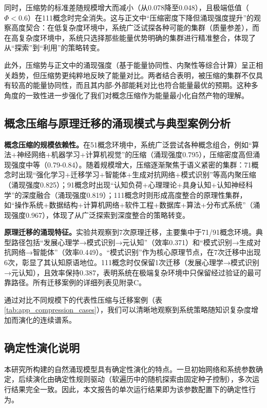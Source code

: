 \documentclass[12pt,a4paper]{article}
\begin{document}
同时，压缩势的标准差随规模增大而减小（从0.078降至0.048），且极端低值（$\Phi<0.6$）在111概念时完全消失。这与正文中“压缩密度下降但涌现强度提升”的观察高度契合：在低复杂度环境中，系统广泛试探各种可能的集群（质量参差），而在高复杂度环境中，系统只选择那些能量优势明确的集群进行精准整合，体现了从“探索”到“利用”的策略转变。

此外，压缩势与正文中的涌现强度（基于能量协同性、内聚性等综合计算）呈正相关趋势，但压缩势更纯粹地反映了能量对比。两者结合表明，被压缩的集群不仅具有较高的能量协同性，而且其内部-外部能耗对比也符合能量最优的预期。这种多角度的一致性进一步强化了我们对概念压缩作为能量最小化自然产物的理解。

\subsection{概念压缩与原理迁移的涌现模式与典型案例分析}

\textbf{概念压缩的规模依赖性。}在51概念环境中，系统广泛尝试各种概念组合，例如“算法+神经网络+机器学习+计算机视觉”的压缩（涌现强度0.795），压缩密度高但涌现强度中等（0.79-0.84）。随着规模增大，压缩逐渐聚焦于语义紧密的集群：71概念时出现“强化学习+迁移学习+智能体+生成对抗网络+模式识别”等高内聚压缩（涌现强度0.825）；91概念时出现“认知负荷+心理理论+具身认知+认知神经科学”的深度融合（涌现强度0.819）；111概念时则形成高度整合的原理性集群，如“操作系统+数据结构+计算机网络+软件工程+数据库+算法+分布式系统”（涌现强度0.967），体现了从广泛探索到深度整合的策略转变。

\textbf{原理迁移的涌现特征。}实验共观察到7次原理迁移，主要集中于71/91概念环境。典型路径包括“发展心理学→模式识别→元认知”（效率0.371）和“模式识别→生成对抗网络→智能体”（效率0.449）。“模式识别”作为核心原理节点，在7次迁移中出现6次，彰显了其认知原语地位。111概念时仅保留1次迁移（发展心理学→模式识别→元认知），且效率保持0.387，表明系统在极端复杂环境中只保留经过验证的最可靠路径。所有迁移案例的详细列表见附录C。

通过对比不同规模下的代表性压缩与迁移案例（表\ref{tab:app_compression_cases}），我们可以清晰地观察到系统策略随知识复杂度增加而演化的连续谱系。

\subsection{确定性演化说明}

本研究所构建的自然涌现模型具有确定性演化的特点。一旦初始网络和系统参数确定，后续演化由确定性规则驱动（软遍历中的随机探索由固定种子控制），多次运行结果完全一致。因此，本文报告的单次运行结果即为该参数配置下的确定性行为。
\end{document}
